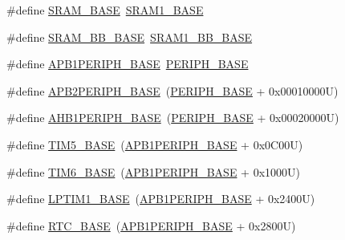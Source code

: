 \begin{DoxyCompactItemize}
\item 
\#define \hyperlink{group___peripheral__registers__structures_ga05e8f3d2e5868754a7cd88614955aecc}{S\+R\+A\+M\+\_\+\+B\+A\+SE}~\hyperlink{group___peripheral__memory__map_ga7d0fbfb8894012dbbb96754b95e562cd}{S\+R\+A\+M1\+\_\+\+B\+A\+SE}
\item 
\#define \hyperlink{group___peripheral__registers__structures_gad3548b6e2f017f39d399358f3ac98454}{S\+R\+A\+M\+\_\+\+B\+B\+\_\+\+B\+A\+SE}~\hyperlink{group___peripheral__memory__map_gac4c4f61082e4b168f29d9cf97dc3ca5c}{S\+R\+A\+M1\+\_\+\+B\+B\+\_\+\+B\+A\+SE}
\item 
\#define \hyperlink{group___peripheral__registers__structures_ga45666d911f39addd4c8c0a0ac3388cfb}{A\+P\+B1\+P\+E\+R\+I\+P\+H\+\_\+\+B\+A\+SE}~\hyperlink{group___peripheral__memory__map_ga9171f49478fa86d932f89e78e73b88b0}{P\+E\+R\+I\+P\+H\+\_\+\+B\+A\+SE}
\item 
\#define \hyperlink{group___peripheral__registers__structures_ga25b99d6065f1c8f751e78f43ade652cb}{A\+P\+B2\+P\+E\+R\+I\+P\+H\+\_\+\+B\+A\+SE}~(\hyperlink{group___peripheral__memory__map_ga9171f49478fa86d932f89e78e73b88b0}{P\+E\+R\+I\+P\+H\+\_\+\+B\+A\+SE} + 0x00010000\+U)
\item 
\#define \hyperlink{group___peripheral__registers__structures_ga811a9a4ca17f0a50354a9169541d56c4}{A\+H\+B1\+P\+E\+R\+I\+P\+H\+\_\+\+B\+A\+SE}~(\hyperlink{group___peripheral__memory__map_ga9171f49478fa86d932f89e78e73b88b0}{P\+E\+R\+I\+P\+H\+\_\+\+B\+A\+SE} + 0x00020000\+U)
\item 
\#define \hyperlink{group___peripheral__registers__structures_ga3e1671477190d065ba7c944558336d7e}{T\+I\+M5\+\_\+\+B\+A\+SE}~(\hyperlink{group___peripheral__memory__map_ga45666d911f39addd4c8c0a0ac3388cfb}{A\+P\+B1\+P\+E\+R\+I\+P\+H\+\_\+\+B\+A\+SE} + 0x0\+C00\+U)
\item 
\#define \hyperlink{group___peripheral__registers__structures_ga8268ec947929f192559f28c6bf7d1eac}{T\+I\+M6\+\_\+\+B\+A\+SE}~(\hyperlink{group___peripheral__memory__map_ga45666d911f39addd4c8c0a0ac3388cfb}{A\+P\+B1\+P\+E\+R\+I\+P\+H\+\_\+\+B\+A\+SE} + 0x1000\+U)
\item 
\#define \hyperlink{group___peripheral__registers__structures_ga012ceb003fbb615eedb39a8d7f31c9c6}{L\+P\+T\+I\+M1\+\_\+\+B\+A\+SE}~(\hyperlink{group___peripheral__memory__map_ga45666d911f39addd4c8c0a0ac3388cfb}{A\+P\+B1\+P\+E\+R\+I\+P\+H\+\_\+\+B\+A\+SE} + 0x2400\+U)
\item 
\#define \hyperlink{group___peripheral__registers__structures_ga4265e665d56225412e57a61d87417022}{R\+T\+C\+\_\+\+B\+A\+SE}~(\hyperlink{group___peripheral__memory__map_ga45666d911f39addd4c8c0a0ac3388cfb}{A\+P\+B1\+P\+E\+R\+I\+P\+H\+\_\+\+B\+A\+SE} + 0x2800\+U)

\end{DoxyCompactItemize}
